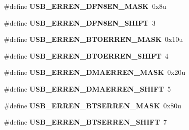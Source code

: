 \begin{DoxyCompactItemize}
\item 
\hypertarget{group___u_s_b___register___masks_ga4077d6e25312cdf05ef982907720c2f6}{}\#define {\bfseries U\+S\+B\+\_\+\+E\+R\+R\+E\+N\+\_\+\+D\+F\+N8\+E\+N\+\_\+\+M\+A\+S\+K}~0x8u\label{group___u_s_b___register___masks_ga4077d6e25312cdf05ef982907720c2f6}

\item 
\hypertarget{group___u_s_b___register___masks_ga25ff64c64f5871c1c278c5639d862ba7}{}\#define {\bfseries U\+S\+B\+\_\+\+E\+R\+R\+E\+N\+\_\+\+D\+F\+N8\+E\+N\+\_\+\+S\+H\+I\+F\+T}~3\label{group___u_s_b___register___masks_ga25ff64c64f5871c1c278c5639d862ba7}

\item 
\hypertarget{group___u_s_b___register___masks_ga3e02cf7d8b6fce5077848051a320c609}{}\#define {\bfseries U\+S\+B\+\_\+\+E\+R\+R\+E\+N\+\_\+\+B\+T\+O\+E\+R\+R\+E\+N\+\_\+\+M\+A\+S\+K}~0x10u\label{group___u_s_b___register___masks_ga3e02cf7d8b6fce5077848051a320c609}

\item 
\hypertarget{group___u_s_b___register___masks_ga6df540868c71ce6e3c7b8737a048c2aa}{}\#define {\bfseries U\+S\+B\+\_\+\+E\+R\+R\+E\+N\+\_\+\+B\+T\+O\+E\+R\+R\+E\+N\+\_\+\+S\+H\+I\+F\+T}~4\label{group___u_s_b___register___masks_ga6df540868c71ce6e3c7b8737a048c2aa}

\item 
\hypertarget{group___u_s_b___register___masks_gae1e237556956a0eb5e669aadded213b8}{}\#define {\bfseries U\+S\+B\+\_\+\+E\+R\+R\+E\+N\+\_\+\+D\+M\+A\+E\+R\+R\+E\+N\+\_\+\+M\+A\+S\+K}~0x20u\label{group___u_s_b___register___masks_gae1e237556956a0eb5e669aadded213b8}

\item 
\hypertarget{group___u_s_b___register___masks_ga8b75afb2fa004a75b39023e38db4e784}{}\#define {\bfseries U\+S\+B\+\_\+\+E\+R\+R\+E\+N\+\_\+\+D\+M\+A\+E\+R\+R\+E\+N\+\_\+\+S\+H\+I\+F\+T}~5\label{group___u_s_b___register___masks_ga8b75afb2fa004a75b39023e38db4e784}

\item 
\hypertarget{group___u_s_b___register___masks_ga806a809f05df66a7669733c599646f7f}{}\#define {\bfseries U\+S\+B\+\_\+\+E\+R\+R\+E\+N\+\_\+\+B\+T\+S\+E\+R\+R\+E\+N\+\_\+\+M\+A\+S\+K}~0x80u\label{group___u_s_b___register___masks_ga806a809f05df66a7669733c599646f7f}

\item 
\hypertarget{group___u_s_b___register___masks_ga5e760a100c4f43ecfd71952a5f393d77}{}\#define {\bfseries U\+S\+B\+\_\+\+E\+R\+R\+E\+N\+\_\+\+B\+T\+S\+E\+R\+R\+E\+N\+\_\+\+S\+H\+I\+F\+T}~7\label{group___u_s_b___register___masks_ga5e760a100c4f43ecfd71952a5f393d77}


\end{DoxyCompactItemize}
